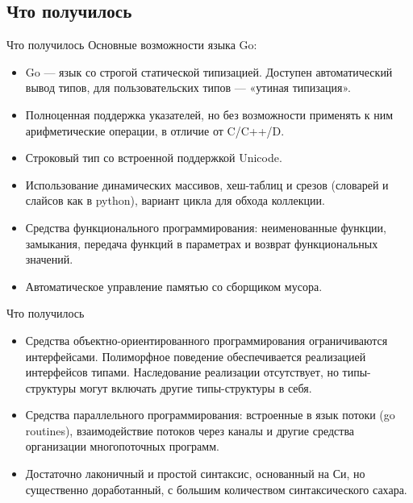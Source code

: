 \subsection{Что получилось}
\begin{frame}{Что получилось}
    Основные возможности языка Go:
    \begin{itemize}
        \item Go — язык со строгой статической типизацией. Доступен автоматический вывод типов, для пользовательских типов — «утиная типизация».
        \item Полноценная поддержка указателей, но без возможности применять к ним арифметические операции, в отличие от C/C++/D.
        \item Строковый тип со встроенной поддержкой Unicode.
        \item Использование динамических массивов, хеш-таблиц и срезов (словарей и слайсов как в python), вариант цикла для обхода коллекции.
        \item Средства функционального программирования: неименованные функции, замыкания, передача функций в параметрах и возврат функциональных значений.
        \item Автоматическое управление памятью со сборщиком мусора.
    \end{itemize}
\end{frame}
\begin{frame}{Что получилось}
\begin{itemize}
    \item Средства объектно-ориентированного программирования ограничиваются интерфейсами. Полиморфное поведение обеспечивается реализацией интерфейсов типами. Наследование реализации отсутствует, но типы-структуры могут включать другие типы-структуры в себя.
    \item Средства параллельного программирования: встроенные в язык потоки (go routines), взаимодействие потоков через каналы и другие средства организации многопоточных программ.
    \item Достаточно лаконичный и простой синтаксис, основанный на Си, но существенно доработанный, с большим количеством синтаксического сахара.
\end{itemize}
\end{frame}